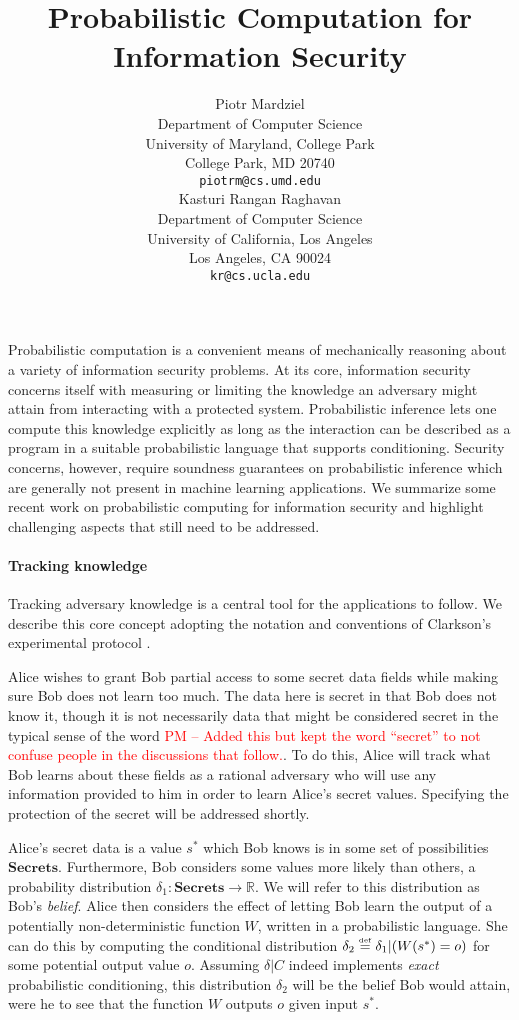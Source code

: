 \documentclass{article} %
\title{Probabilistic Computation for Information Security}
\author{
Piotr Mardziel\\
Department of Computer Science\\
University of Maryland, College Park\\
College Park, MD 20740 \\
\texttt{piotrm@cs.umd.edu} \\
\And
Kasturi Rangan Raghavan\\
Department of Computer Science\\
University of California, Los Angeles\\
Los Angeles, CA 90024\\
\texttt{kr@cs.ucla.edu} \\
}
\newcommand{\pxm}[1]{\textcolor{red}{PM -- #1}}
\newcommand{\ra}{\rightarrow}
\newcommand{\Real}{\mathbb{R}}
\newcommand{\secrets}[0]{\textbf{Secrets}}
\newcommand{\asecret}[0]{s}
\newcommand{\rsecret}[0]{\asecret^*}
\newcommand{\cond}[0]{|}
\newcommand{\stacklabel}[1]{\stackrel{\smash{\scriptscriptstyle \mathrm{#1}}}}
\newcommand{\defeq}{\stacklabel{def}=}
\theoremstyle{plain} %
\theoremstyle{definition} %
\begin{document}
\maketitle

Probabilistic computation is a convenient means of mechanically
reasoning about a variety of information security problems. At its
core, information security concerns itself with measuring or limiting
the knowledge an adversary might attain from interacting with a
protected system. Probabilistic inference lets one compute this
knowledge explicitly as long as the interaction can be described as a
program in a suitable probabilistic language that supports
conditioning. Security concerns, however, require soundness guarantees
on probabilistic inference which are generally not present in machine
learning applications. We summarize some recent work on probabilistic
computing for information security and highlight challenging aspects
that still need to be addressed.

\paragraph*{Tracking knowledge}

Tracking adversary knowledge is a central tool for the applications to
follow. We describe this core concept adopting the notation and
conventions of Clarkson's experimental protocol
\cite{clarkson09quantifying}.

Alice wishes to grant Bob partial access to some secret data fields
while making sure Bob does not learn too much. The data here is secret
in that Bob does not know it, though it is not necessarily data that
might be considered secret in the typical sense of the word \pxm{Added
  this but kept the word ``secret'' to not confuse people in the
  discussions that follow.}. To do this, Alice will track what Bob learns about these
fields as a rational adversary who will use any information provided
to him in order to learn Alice's secret values. Specifying the
protection of the secret will be addressed shortly.

Alice's secret data is a value $ \rsecret $ which Bob knows is in some
set of possibilities $ \secrets $. Furthermore, Bob considers some
values more likely than others, a probability distribution $ \delta_1
: \secrets \ra \Real $. We will refer to this distribution as Bob's
\emph{belief}. Alice then considers the effect of letting Bob learn
the output of a potentially non-deterministic function $ W $, written
in a probabilistic language. She can do this by computing the
conditional distribution $ \delta_2 \defeq \delta_1 \cond (W(\rsecret)
= o) $ for some potential output value $ o $. Assuming $ \delta | C $
indeed implements \emph{exact} probabilistic conditioning, this
distribution $ \delta_2 $ will be the belief Bob would attain, were he
to see that the function $ W $ outputs $ o $ given input $ \rsecret $.
\end{document}
